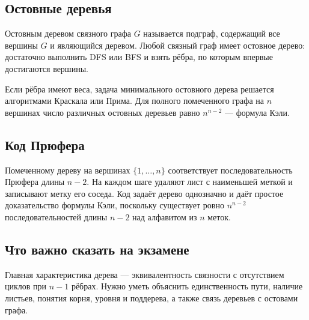 \subsection{Остовные деревья}

Остовным деревом связного графа $G$ называется подграф, содержащий все вершины
$G$ и являющийся деревом. Любой связный граф имеет остовное дерево: достаточно
выполнить DFS или BFS и взять рёбра, по которым впервые достигаются вершины.

Если рёбра имеют веса, задача минимального остовного дерева решается алгоритмами
Краскала или Прима. Для полного помеченного графа на $n$ вершинах число различных
остовных деревьев равно $n^{n-2}$ --- формула Кэли.

\subsection{Код Прюфера}

Помеченному дереву на вершинах $\{1,\ldots,n\}$ соответствует последовательность
Прюфера длины $n-2$. На каждом шаге удаляют лист с наименьшей меткой и записывают
метку его соседа. Код задаёт дерево однозначно и даёт простое доказательство
формулы Кэли, поскольку существует ровно $n^{n-2}$ последовательностей длины
$n-2$ над алфавитом из $n$ меток.

\subsection{Что важно сказать на экзамене}

Главная характеристика дерева --- эквивалентность связности с отсутствием циклов
при $n-1$ рёбрах. Нужно уметь объяснить единственность пути, наличие листьев,
понятия корня, уровня и поддерева, а также связь деревьев с остовами графа.

\newpage